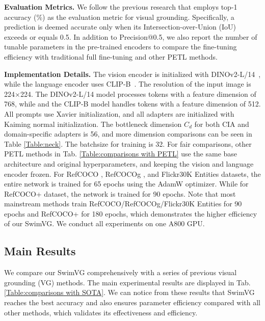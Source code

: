 \noindent
\textbf{Evaluation Metrics.} We follow the previous research that employs top-1 accuracy (\%) as the evaluation metric for visual grounding. Specifically, a prediction is deemed accurate only when its Intersection-over-Union (IoU) exceeds or equals 0.5. In addition to Precision@0.5, we also report the number of tunable parameters in the pre-trained encoders to compare the fine-tuning efficiency with traditional full fine-tuning and other PETL methods.



\noindent \textbf{Implementation Details.} The vision encoder is initialized with DINOv2-L/14~\cite{oquab2023dinov2}, while the language encoder uses CLIP-B~\cite{radford2021learning}. The resolution of the input image is 224×224. The DINOv2-L/14 model processes tokens with a feature dimension of 768, while 
and the CLIP-B model handles tokens with a feature dimension of 512. All prompts use Xavier initialization, and all adapters are initialized with Kaiming normal initialization. The bottleneck dimension $C_d$ for both CIA and domain-specific adapters is 56, and more dimension comparisons can be seen in Table \ref{Table:neck}. The batchsize for training is 32. For fair comparisons, other PETL methods in Tab. \ref{Table:comparisons with PETL} use the same base architecture and original hyperparameters, and keeping the vision and language encoder frozen. For RefCOCO \cite{yu2016refcoco}, RefCOCOg \cite{mao2016refcocogg,nagaraja2016refcocogu}, and Flickr30K Entities \cite{plummer2015flickr30k} datasets, the entire network is trained for 65 epochs using the AdamW optimizer. While for RefCOCO+ \cite{yu2016refcoco} dataset, the network is trained for 90 epochs. Note that most mainstream methods train RefCOCO/RefCOCOg/Flickr30K Entities for 90 epochs and RefCOCO+ for 180 epochs, which demonstrates the higher efficiency of our SwimVG. We conduct all experiments on one A800 GPU.




\subsection{Main Results}
We compare our SwimVG comprehensively with a series of previous visual grounding (VG) methods. The main experimental results are displayed in Tab. \ref{Table:comparisons with SOTA}. We can notice from these results that SwimVG reaches the best accuracy and also ensures parameter efficiency compared with all other methods, which validates its effectiveness and efficiency.

